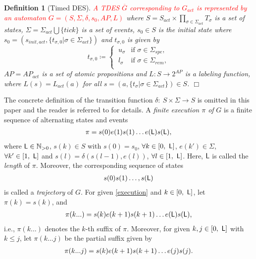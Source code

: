 \documentclass{article}
\newcommand{\qedwhite}{\hfill \ensuremath{\Box}}
\newtheorem{dfn}{Definition}
\newcommand{\req}[1]{\eqref{#1}}
\newcommand{\Len}{{\sf L}}
\newcommand{\red}[1]{\textcolor{red}{#1}}
\begin{document}
\begin{dfn}[Timed DES]\label{def:G}
\red{A TDES $\overline{G}$ corresponding to $G_{act}$ is represented by an automaton $G=(S, \Sigma, \delta, s_0,AP, L)$} where $S = S_{act} \times \prod_{\sigma\in \Sigma_{act}} T_{\sigma}$ is a set of states, $\Sigma= \Sigma_{act} \bigcup \{\textit{tick}\}$ is a set of events, $s_0 \in S$ is the initial state where $s_0 = (s_{init,act}, \{ t_{\sigma,0} | \sigma \in \Sigma_{act} \})$ and $t_{\sigma,0}$ is given by
					\begin{equation}
						t_{\sigma, 0} \coloneqq \left\{
						\begin{array}{ll}  
							\ u_{\sigma}  & \mbox{if } {\sigma} \in \Sigma_{spe}, \\
							\ l_{\sigma} & \mbox{if } {\sigma } \in \Sigma_{rem}, \\
						\end{array} \right.
					\end{equation}	
$AP = AP_{act} $ is a set of  atomic propositions and $L  : S \rightarrow 2^{AP} $ is a labeling function, where $L(s)=L_{act}(a)$ for all $s = (a, \{ t_\sigma | \sigma \in \Sigma_{act} \}) \in S$. \qedwhite \end{dfn}
%
The concrete definition of the transition function $\delta:~S\times \Sigma \to S$ is omitted in this paper and the reader is referred to \cite{BW1994} for details.
%
%
%
%
A \textit{finite execution $\pi$ of} $G$ is a finite sequence of alternating states and events
\begin{align}\label{execution}
\pi = s(0)e(1)s(1)\ldots e(\Len) s(\Len), 
\end{align}
where $\Len \in \mathbb{N}_{> 0}$, 
$s(k) \in S$ with $s(0) = s_0$, $\forall k\in[0,\ \Len]$, $e(k') \in \Sigma$, $\forall k' \in [1,\ \Len]$ and $s(l)= \delta(s({l-1}), e({l}))$, $\forall l\in [1,\ \Len]$. 
Here, $\Len$ is called the \textit{length} of $\pi$.
Moreover, the corresponding sequence of states 
\begin{align}
s(0) s(1) \ldots, s(\Len) \notag
\end{align}
is called a \textit{trajectory} of $G$. 
For given \req{execution} and $k\in[0,\ \Len]$, let $\pi(k) = s(k)$, and 
\begin{align}
\pi(k...) = s(k) e({k+1}) s({k+1}) \ldots e({\Len}) s({\Len}), \notag 
\end{align}
i.e., $\pi(k...)$ denotes the $k$-th suffix of $\pi$. Moreover, for given $k, j\in[0,\ \Len]$ with $k\leq j$, let $\pi(k...j)$ be the partial suffix given by 
\begin{align}
\pi(k...j) = s(k) e({k+1}) s({k+1}) \ldots e({j}) s({j}). \notag 
\end{align}
\end{document}
